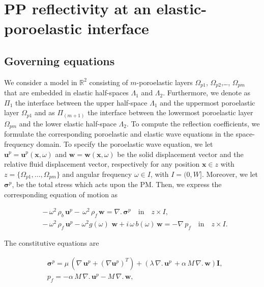 \documentclass[draft]{agujournal2019}
\begin{document}
\section{PP reflectivity  at an elastic-poroelastic interface}

\subsection{Governing equations}
We consider a model in $\mathbb R^2$ consisting of 
$m$-poroelastic layers  $\Omega_{p1}$,  $\Omega_{p2}$,\dots, $\Omega_{pm}$ that are embedded in elastic half-spaces $\Lambda_1$ and $\Lambda_2$. Furthermore, we denote as $\Pi_1$  the interface between the upper half-space $\Lambda_1$ and the uppermost poroelastic layer $\Omega_{p1}$ and as $\Pi_{(m+1)}$ the interface between the lowermost poroelastic layer $\Omega_{pm}$ and the lower elastic half-space $\Lambda_2$. To compute the  reflection coefficients, we formulate the corresponding poroelastic and elastic wave equations in the space-frequency domain. To specify the poroelastic wave equation,  we let $\bm{u}^p =\bm{u}^p( \bm{x}, \omega)$ and $\bm{w} =\bm{w}( \bm{x}, \omega)$  be the solid displacement vector and the relative fluid displacement vector, respectively for any position $\bm{x} \in z$ with $z=\{\Omega_{p1},\dots,\Omega_{pm}\}$  and angular frequency $\omega \in I$, with $I =(0,W]$. Moreover, we let $\bm {\sigma}^p$, be the total stress which acts upon the PM. Then, we express the corresponding equation of motion as
\begin{linenomath*}
\begin{equation}\label{Eq.a1}
\begin{split}
& -\,\omega^2  \, \rho_b  \, \bm{u}^p -  \,\omega^2 \, \rho_f \, \bm{w}= \nabla . \, \bm{\sigma}^p \quad  \textrm{in} \quad z \times I, \\
& -\,\omega^2  \, \rho_f \, \bm{u}^p - \omega^2 g(\omega) \, \, \bm{w} + i \, \omega \, b(\omega) \, \bm{w} = - \nabla \, p_f \quad  \textrm{in} \quad z \times I.
\end{split}
\end{equation}
\end{linenomath*}
The constitutive equations are
\begin{linenomath*}
\begin{equation}\label{Eq.a2}
\begin{split}
& \bm{\sigma}^p = \mu \,  \left( \nabla \,\bm{u}^p + ({\nabla  \bm{u}^p})^T  \right) +  \left( \lambda \, \nabla . \, \bm{u}^p\, + \alpha \,M \, \nabla . \, \bm{w} \right) \bm{I}, \\
&p_f=- \alpha \, M \, \nabla . \, \bm{u}^p - M \, \nabla . \, \bm{w},  \end{split}
\end{equation}
\end{linenomath*}
\end{document}
